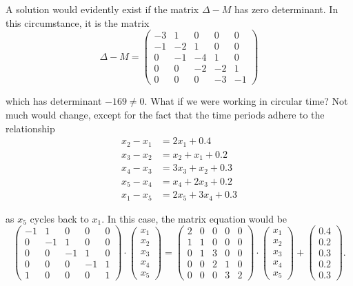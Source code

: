 \documentclass[a4paper, 12pt,oneside,openany]{book}
\begin{document}
{A solution would evidently exist if the matrix $\Delta-M$ has zero determinant. In this circumstance, it is the matrix $$\Delta -M  = \begin{pmatrix} -3&1&0&0&0 \\ -1&-2&1&0&0\\0&-1&-4&1&0 \\ 0&0&-2&-2&1 \\0&0&0&-3&-1 \end{pmatrix}$$

which has determinant $-169\neq0$. What if we were working in circular time? Not much would change, except for the fact that the time periods adhere to the relationship \begin{align*}
	x_2 -x_1&= 2x_1+0.4\\
	x_3 -x_2&= x_2+x_1 + 0.2\\
	x_4 -x_3&= 3x_3+x_2 + 0.3 \\
	x_5 -x_4&= x_4+2x_3 + 0.2 \\
	x_1 -x_5&= 2x_5 + 3x_4 + 0.3
\end{align*}

as $x_5$ cycles back to $x_1$. In this case, the matrix equation would be $$ \begin{pmatrix} -1 & 1 & 0 & 0 & 0 \\ 0 & -1 & 1 & 0 & 0 \\ 0 & 0 & -1 & 1 & 0 \\ 0 & 0 & 0 & -1 & 1 \\ 1&0&0&0&1 \end{pmatrix} \cdot \begin{pmatrix} x_1\\x_2\\x_3\\x_4\\x_5 \end{pmatrix}= \begin{pmatrix} 2 & 0 & 0 & 0 & 0 \\ 1 & 1 & 0 & 0 & 0 \\ 0 & 1 & 3 & 0 & 0 \\ 0 & 0 & 2 & 1 & 0 \\ 0&0&0&3&2 \end{pmatrix}\cdot  \begin{pmatrix} x_1\\x_2\\x_3\\x_4\\x_5 \end{pmatrix}+ \begin{pmatrix} 0.4\\0.2\\0.3\\0.2\\0.3 \end{pmatrix}.$$

}
\end{document}
